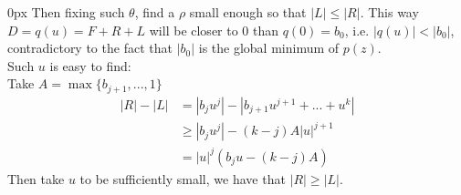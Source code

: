 \documentclass{article}
\begin{document}
\begin{addmargin}[10px]{0px}
    Then fixing such $\theta$, find a $\rho$ small enough so that $|L| \leq |R|$. This way $D = q(u) = F + R + L$ will be closer to $0$ than $q(0) = b_0$, i.e. $|q(u)| < |b_0|$, contradictory to the fact that $|b_0|$ is the global minimum of $p(z)$.\\
    Such $u$ is easy to find:\\
    Take $A = \max \{b_{j+1}, ..., 1\}$
    \begin{equation*}
        \begin{split}
            |R| - |L| &= |b_ju^j| - |b_{j+1}u^{j+1} + ... + u^{k}|\\
            &\geq |b_ju^j| - (k-j)A|u|^{j+1}\\
            &= |u|^j (b_ju - (k-j)A)
        \end{split}
    \end{equation*}
    Then take $u$ to be sufficiently small, we have that $|R| \geq |L|$.
\end{addmargin}
\end{document}

